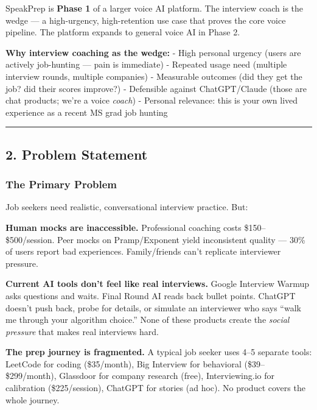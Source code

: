 \documentclass[
  11pt,
]{article}
\begin{document}
SpeakPrep is \textbf{Phase 1} of a larger voice AI platform. The
interview coach is the wedge --- a high-urgency, high-retention use case
that proves the core voice pipeline. The platform expands to general
voice AI in Phase 2.

\textbf{Why interview coaching as the wedge:} - High personal urgency
(users are actively job-hunting --- pain is immediate) - Repeated usage
need (multiple interview rounds, multiple companies) - Measurable
outcomes (did they get the job? did their scores improve?) - Defensible
against ChatGPT/Claude (those are chat products; we're a voice
\emph{coach}) - Personal relevance: this is your own lived experience as
a recent MS grad job hunting

\begin{center}\rule{0.5\linewidth}{0.5pt}\end{center}

\hypertarget{problem-statement}{%
\subsection{2. Problem Statement}\label{problem-statement}}

\hypertarget{the-primary-problem}{%
\subsubsection{The Primary Problem}\label{the-primary-problem}}

Job seekers need realistic, conversational interview practice. But:

\textbf{Human mocks are inaccessible.} Professional coaching costs
\$150--\$500/session. Peer mocks on Pramp/Exponent yield inconsistent
quality --- 30\% of users report bad experiences. Family/friends can't
replicate interviewer pressure.

\textbf{Current AI tools don't feel like real interviews.} Google
Interview Warmup asks questions and waits. Final Round AI reads back
bullet points. ChatGPT doesn't push back, probe for details, or simulate
an interviewer who says ``walk me through your algorithm choice.'' None
of these products create the \emph{social pressure} that makes real
interviews hard.

\textbf{The prep journey is fragmented.} A typical job seeker uses 4--5
separate tools: LeetCode for coding (\$35/month), Big Interview for
behavioral (\$39--\$299/month), Glassdoor for company research (free),
Interviewing.io for calibration (\$225/session), ChatGPT for stories (ad
hoc). No product covers the whole journey.
\end{document}
